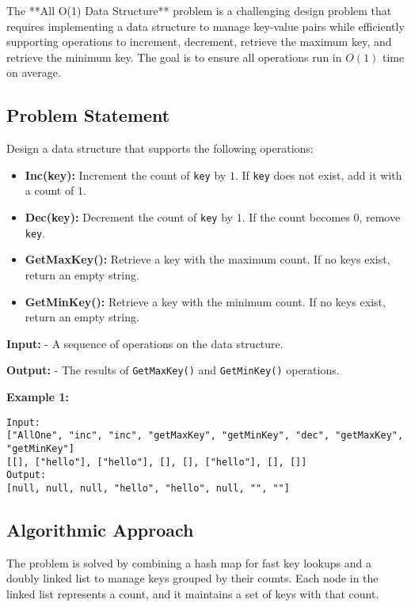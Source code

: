 
\label{problem:All_O_One_Data_Structure}

The **All O(1) Data Structure** problem is a challenging design problem that requires implementing a data structure to manage key-value pairs while efficiently supporting operations to increment, decrement, retrieve the maximum key, and retrieve the minimum key. The goal is to ensure all operations run in \(O(1)\) time on average.

\subsection*{Problem Statement}
Design a data structure that supports the following operations:
\begin{itemize}
    \item \textbf{Inc(key):} Increment the count of \texttt{key} by \(1\). If \texttt{key} does not exist, add it with a count of \(1\).
    \item \textbf{Dec(key):} Decrement the count of \texttt{key} by \(1\). If the count becomes \(0\), remove \texttt{key}.
    \item \textbf{GetMaxKey():} Retrieve a key with the maximum count. If no keys exist, return an empty string.
    \item \textbf{GetMinKey():} Retrieve a key with the minimum count. If no keys exist, return an empty string.
\end{itemize}

\textbf{Input:}
- A sequence of operations on the data structure.

\textbf{Output:}
- The results of \texttt{GetMaxKey()} and \texttt{GetMinKey()} operations.

\textbf{Example 1:}
\begin{verbatim}
Input:
["AllOne", "inc", "inc", "getMaxKey", "getMinKey", "dec", "getMaxKey", "getMinKey"]
[[], ["hello"], ["hello"], [], [], ["hello"], [], []]
Output:
[null, null, null, "hello", "hello", null, "", ""]
\end{verbatim}

\subsection*{Algorithmic Approach}
The problem is solved by combining a hash map for fast key lookups and a doubly linked list to manage keys grouped by their counts. Each node in the linked list represents a count, and it maintains a set of keys with that count.

